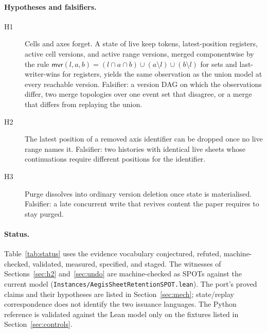 \documentclass[11pt]{article}
\newcommand{\lean}[1]{\texttt{\def\_{\textunderscore\allowbreak}#1}}
\newcommand{\mvr}{\mathsf{mvr}}
\begin{document}
\paragraph{Hypotheses and falsifiers.}
\begin{description}
\item[H1] Cells and axes forget. A state of live keep tokens, latest-position
registers, active cell versions, and active range versions, merged
componentwise by the rule $\mvr(l,a,b)=(l\cap a\cap b)\cup(a\setminus l)
\cup(b\setminus l)$ for sets and last-writer-wins for registers, yields the
same observation as the union model at every reachable version.
Falsifier: a version DAG on which the observations differ, two merge
topologies over one event set that disagree, or a merge that differs from
replaying the union.
\item[H2] The latest position of a removed axis identifier can be dropped
once no live range names it. Falsifier: two histories with identical live
sheets whose continuations require different positions for the identifier.
\item[H3] Purge dissolves into ordinary version deletion once state is
materialised. Falsifier: a late concurrent write that revives content the
paper requires to stay purged.
\end{description}

\paragraph{Status.} Table~\ref{tab:status} uses the evidence vocabulary
conjectured, refuted, machine-checked, validated, measured, specified, and
staged. The witnesses of Sections~\ref{sec:h2} and~\ref{sec:undo} are
machine-checked as SPOTs against the current model
(\lean{Instances/AegisSheetRetentionSPOT.lean}). The port's proved claims and
their hypotheses are listed in Section~\ref{sec:mech}; state/replay
correspondence does not identify the two issuance languages.
The Python reference is validated against the Lean model only on the
fixtures listed in Section~\ref{sec:controls}.
\end{document}
